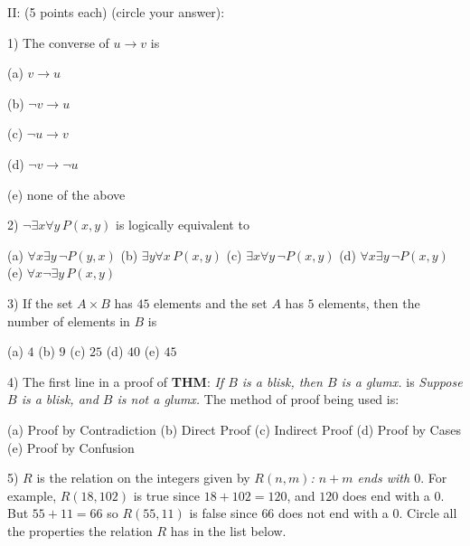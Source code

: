 \documentclass[11pt]{amsart}
\begin{document}
 
 
 
 
II: (5 points each)  (circle your answer):

\vfill

1) The converse of $u\longrightarrow v$ is

\hskip 20pt {\color{red}(a) $v \longrightarrow u$}\hfill

\hskip 20pt (b) $\neg v \longrightarrow u$\hfill

\hskip 20pt (c) $\neg u \longrightarrow v$\hfill

\hskip 20pt (d) $\neg v \longrightarrow \neg u$\hfill

\hskip 20pt (e) none of the above\hfill

\vfill


2) $\neg \exists{x}\forall{y}\,P(x,y)$ is logically equivalent to

\vskip 5pt
\hskip 20pt (a) $ \forall{x}\exists{y}\,\neg P(y,x)$\hfill
\vskip 5pt
\hskip 20pt (b) $\exists{y}\forall{x}\,P(x,y)$\hfill
\vskip 5pt
\hskip 20pt (c) $\exists{x}\forall{y}\,\neg P(x,y) $\hfill
\vskip 5pt
\hskip 20pt {\color{red}(d) $\forall{x}\exists{y}\,\neg P(x,y)$}\hfill
\vskip 5pt
\hskip 20pt (e) $\forall{x}\neg \exists{y}\,P(x,y)$\hfill

\vfill

3)  If the set $A\times B$ has $45$ elements and the set $A$ has $5$ elements, then the
number
\vskip -1pt\hskip 13pt  of elements in $B$ is

\vskip 5pt
\hskip 20pt (a) $4$\hfill
\vskip 5pt
\hskip 20pt{\color{red} (b) $9$}\hfill
\vskip 5pt
\hskip 20pt (c) $25$\hfill
\vskip 5pt
\hskip 20pt (d) $40$\hfill
\vskip 5pt
\hskip 20pt (e) $45$\hfill

 
\vfill


4) The first line in a proof of {\bf THM}: {\it If $B$ is a  blisk, then $B$ is a glumx.} is 
\vskip -1pt\hskip 13pt {\it Suppose  $B$ is a blisk, and $B$ is not a glumx.}
The method of proof being used is:

\vskip 5pt
    \hskip 20pt {\color{red}(a) Proof by Contradiction}\hfill
\vskip 5pt
\hskip 20pt (b) Direct Proof\hfill
\vskip 5pt
\hskip 20pt (c) Indirect Proof\hfill
\vskip 5pt
\hskip 20pt (d) Proof by Cases\hfill
\vskip 5pt
\hskip 20pt (e) Proof by Confusion\hfill

\vfill
\break

5)  $R$ is the relation on the integers given by {\itshape $R(n,m)$: $n+m$ ends with $0$}. For example,
\vskip -1pt\hskip 13pt $R(18,102)$ is true since $18+102 = 120$, and $120$ does end with a $0$. But $55+11= 66$
\vskip -1pt\hskip 13pt so $R(55,11)$ is false since $66$ does not end with a $0$. Circle all the  
properties the  relation 
\vskip -1pt\hskip 13pt $R$ has in the list below.
\end{document}
